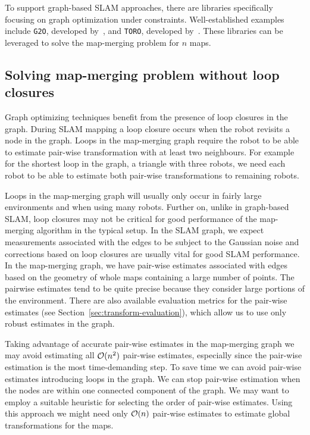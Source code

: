 To support graph-based \gls{SLAM} approaches, there are libraries specifically focusing on graph optimization under constraints. Well-established examples include \texttt{G2O}, developed by~\citet{kummerle2011g2o}, and \texttt{TORO}, developed by~\citet{grisetti2007toro}. These libraries can be leveraged to solve the map-merging problem for $n$ maps.

\subsection{Solving map-merging problem without loop closures}

Graph optimizing techniques benefit from the presence of loop closures in the graph. During \gls{SLAM} mapping a loop closure occurs when the robot revisits a node in the graph. Loops in the map-merging graph require the robot to be able to estimate pair-wise transformation with at least two neighbours. For example for the shortest loop in the graph, a triangle with three robots, we need each robot to be able to estimate both pair-wise transformations to remaining robots.

Loops in the map-merging graph will usually only occur in fairly large environments and when using many robots. Further on, unlike in graph-based \gls{SLAM}, loop closures may not be critical for good performance of the map-merging algorithm in the typical setup. In the \gls{SLAM} graph, we expect measurements associated with the edges to be subject to the Gaussian noise and corrections based on loop closures are usually vital for good \gls{SLAM} performance. In the map-merging graph, we have pair-wise estimates associated with edges based on the geometry of whole maps containing a large number of points. The pairwise estimates tend to be quite precise because they consider large portions of the environment. There are also available evaluation metrics for the pair-wise estimates (see Section~\ref{sec:transform-evaluation}), which allow us to use only robust estimates in the graph.

Taking advantage of accurate pair-wise estimates in the map-merging graph we may avoid estimating all $\operatorname{\mathcal{O}}(n^2)$ pair-wise estimates, especially since the pair-wise estimation is the most time-demanding step. To save time we can avoid pair-wise estimates introducing loops in the graph. We can stop pair-wise estimation when the nodes are within one connected component of the graph. We may want to employ a suitable heuristic for selecting the order of pair-wise estimates. Using this approach we might need only $\operatorname{\mathcal{O}}(n)$ pair-wise estimates to estimate global transformations for the maps.

